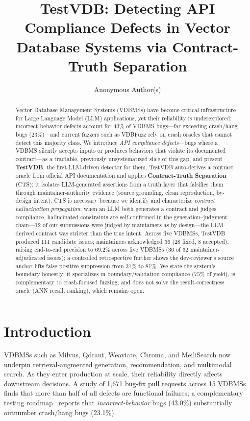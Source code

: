 \documentclass[sigconf, anonymous, review]{acmart}
\title{TestVDB: Detecting API Compliance Defects in Vector Database Systems via Contract-Truth Separation}
\author{Anonymous Author(s)}
\affiliation{\institution{Anonymized for review}}
\begin{document}
\begin{abstract}
Vector Database Management Systems (VDBMSs) have become critical infrastructure for Large Language Model (LLM) applications, yet their reliability is underexplored: incorrect-behavior defects account for 43\% of VDBMS bugs---far exceeding crash/hang bugs (23\%)---and current fuzzers such as VDBFuzz rely on crash oracles that cannot detect this majority class. We introduce \emph{API compliance defects}---bugs where a VDBMS silently accepts inputs or produces behaviors that violate its documented contract---as a tractable, previously unsystematized slice of this gap, and present \textbf{TestVDB}, the first LLM-driven detector for them. TestVDB auto-derives a contract oracle from official API documentation and applies \textbf{Contract-Truth Separation} (CTS): it isolates LLM-generated assertions from a truth layer that falsifies them through maintainer-authority evidence (source grounding, clean reproduction, by-design intent). CTS is necessary because we identify and characterize \emph{contract hallucination propagation}: when an LLM both generates a contract and judges compliance, hallucinated constraints are self-confirmed in the generation--judgment chain---12 of our submissions were judged by maintainers as by-design---the LLM-derived contract was stricter than the true intent. Across five VDBMSs, TestVDB produced 111 candidate issues; maintainers acknowledged 36 (28 fixed, 8 accepted), raising end-to-end precision to 69.2\% across five VDBMSs (36 of 52 maintainer-adjudicated issues); a controlled retrospective further shows the dev-reviewer's source anchor lifts false-positive suppression from 31\% to 81\%. We state the system's boundary honestly: it specializes in boundary/validation compliance (75\% of yield), is complementary to crash-focused fuzzing, and does not solve the result-correctness oracle (ANN recall, ranking), which remains open.
\end{abstract}

\maketitle

\section{Introduction}\label{sec:intro}

VDBMSs such as Milvus, Qdrant, Weaviate, Chroma, and MeiliSearch now underpin retrieval-augmented generation, recommendation, and multimodal search. As they enter production at scale, their reliability directly affects downstream decisions. A study of 1{,}671 bug-fix pull requests across 15 VDBMSs~\cite{bugstudy25} finds that more than half of all defects are functional failures; a complementary testing roadmap~\cite{roadmap25} reports that \emph{incorrect-behavior} bugs (43.0\%) substantially outnumber crash/hang bugs (23.1\%).
\end{document}
